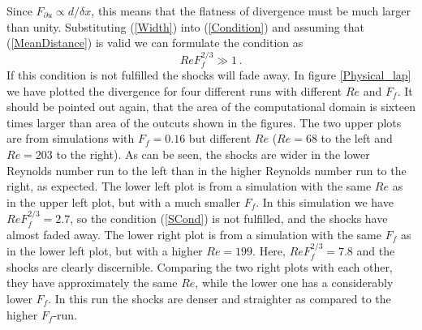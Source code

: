 Since $ F_{\partial u} \propto d/\delta x $, this means that the flatness of divergence must be much larger than unity. Substituting (\ref{Width}) into (\ref{Condition})  and assuming that (\ref{MeanDistance}) is valid we can formulate the condition as
\begin{equation}  \label{SCond}
Re F_f^{2/3} \gg 1 \, .
\end{equation} 
If this condition is not fulfilled the shocks will fade away.  In figure \ref{Physical_lap} we have plotted the divergence for four different runs with different $ Re $ and $ F_f $. It should be pointed out again, that the area of the computational domain is sixteen times larger than area of the outcuts shown in the figures.  The two upper plots are from simulations with  $ F_f = 0.16 $ but different $ Re $ ($ Re = 68 $ to the left and { $ Re = 203 $ } to the right). As can be seen, the shocks are wider in the lower Reynolds number run to the left than in the higher Reynolds number run to the right, as expected. The lower left plot is from a simulation with the same $ Re $ as in the upper left plot, but with a much smaller $ F_f $. In this simulation we have $ Re F_f^{2/3} = 2.7 $, so the condition (\ref{SCond}) is not fulfilled, and the shocks have almost faded away. The lower right plot is from a simulation with the same $ F_f $ as in the lower left plot, but with a higher $ Re = 199 $. Here, $ Re F_f^{2/3} = 7.8 $ and  the shocks are clearly discernible. { Comparing the two right plots with each other, they have approximately the same $ Re $, while the lower one has a considerably lower $ F_f $.  In this run the shocks are denser and straighter as compared to the higher $ F_f $-run.}



% 
% 
%
% 
